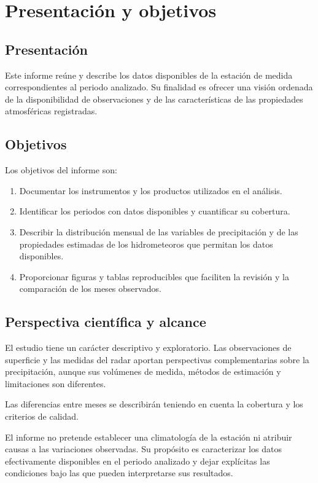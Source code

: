 \section{Presentación y objetivos}
\label{sec:presentacion}

\subsection{Presentación}
\label{sec:presentacion-general}

Este informe reúne y describe los datos disponibles de la estación de medida
\EstacionInforme{} correspondientes al periodo analizado. Su finalidad es
ofrecer una visión ordenada de la disponibilidad de observaciones y de las
características de las propiedades atmosféricas registradas.

\subsection{Objetivos}
\label{sec:objetivos}

Los objetivos del informe son:

\begin{enumerate}
  \item Documentar los instrumentos y los productos utilizados en el análisis.
  \item Identificar los periodos con datos disponibles y cuantificar su cobertura.
  \item Describir la distribución mensual de las variables de precipitación y de
        las propiedades estimadas de los hidrometeoros que permitan los datos
        disponibles.
  \item Proporcionar figuras y tablas reproducibles que faciliten la revisión y
        la comparación de los meses observados.
\end{enumerate}

\subsection{Perspectiva científica y alcance}
\label{sec:alcance}

El estudio tiene un carácter descriptivo y exploratorio. Las observaciones de
superficie y las medidas del radar aportan perspectivas complementarias sobre
la precipitación, aunque sus volúmenes de medida, métodos de estimación y
limitaciones son diferentes.

Las diferencias entre meses se describirán teniendo en cuenta la cobertura y
los criterios de calidad.

El informe no pretende establecer una climatología de la estación ni atribuir
causas a las variaciones observadas. Su propósito es caracterizar los datos
efectivamente disponibles en el periodo analizado y dejar explícitas las
condiciones bajo las que pueden interpretarse sus resultados.
